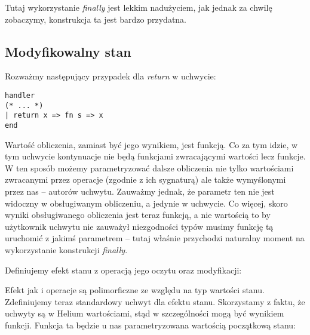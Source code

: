 



Tutaj wykorzystanie \textit{finally} jest lekkim nadużyciem, jak jednak za chwilę zobaczymy, konstrukcja ta jest bardzo przydatna.

\subsection{Modyfikowalny stan}

Rozważmy następujący przypadek dla \textit{return} w uchwycie:

\begin{lstlisting}
handler
(* ... *)
| return x => fn s => x
end
\end{lstlisting}

Wartość obliczenia, zamiast być jego wynikiem, jest funkcją. Co za tym idzie, w tym uchwycie kontynuacje nie będą funkcjami zwracającymi wartości lecz funkcje. W ten sposób możemy parametryzować dalsze obliczenia nie tylko wartościami zwracanymi przez operacje (zgodnie z ich sygnaturą) ale także wymyślonymi przez nas -- autorów uchwytu. Zauważmy jednak, że parametr ten nie jest widoczny w obsługiwanym obliczeniu, a jedynie w uchwycie. Co więcej, skoro wyniki obsługiwanego obliczenia jest teraz funkcją, a nie wartością to by użytkownik uchwytu nie zauważył niezgodności typów musimy funkcję tą uruchomić z jakimś parametrem -- tutaj właśnie przychodzi naturalny moment na wykorzystanie konstrukcji \textit{finally}.

Definiujemy efekt stanu z operacją jego oczytu oraz modyfikacji:



Efekt jak i operacje są polimorficzne ze względu na typ wartości stanu. Zdefiniujemy teraz standardowy uchwyt dla efektu stanu. Skorzystamy z faktu, że uchwyty są w Helium wartościami, stąd w szczególności mogą być wynikiem funkcji. Funkcja ta będzie u nas parametryzowana wartością początkową stanu:

